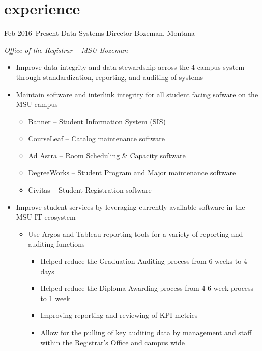 \documentclass[]{two-column-stats} %
\begin{document}

\section{experience}

\begin{entrylist}
\entry
{Feb 2016--Present}
{Data Systems Director}
{Bozeman, Montana}
{\emph{Office of the Registrar -- MSU-Bozeman}
\begin{itemize}
\item Improve data integrity and data stewardship across the 4-campus system through standardization, reporting, and auditing of systems
\item Maintain software and interlink integrity for all student facing sofware on the MSU campus
\begin{itemize}
  \item Banner -- Student Information System (SIS)
  \item CourseLeaf -- Catalog maintenance software
  \item Ad Astra -- Room Scheduling \& Capacity software
  \item DegreeWorks -- Student Program and Major maintenance software
  \item Civitas -- Student Registration software
\end{itemize}
\item Improve student services by leveraging currently available software in the MSU IT ecosystem
\begin{itemize}
  \item Use Argos and Tableau reporting tools for a variety of reporting and auditing functions
  \begin{itemize}
    \item Helped reduce the Graduation Auditing process from 6 weeks to 4 days
    \item Helped reduce the Diploma Awarding process from 4-6 week process to 1 week
    \item Improving reporting and reviewing of KPI metrics
    \item Allow for the pulling of key auditing data by management and staff within the Registrar's Office and campus wide
  \end{itemize}

\end{itemize}
\end{itemize}}
\end{entrylist}
\end{document}

